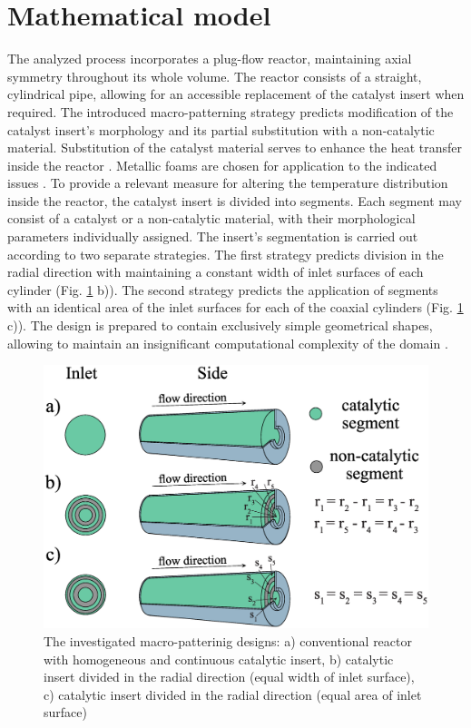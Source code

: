 \documentclass[preprint,12pt]{elsarticle}
\begin{document}
\section{Mathematical model}
\label{sec:math_model}

The analyzed process incorporates a plug-flow reactor, maintaining axial symmetry throughout its whole volume. The reactor consists of a straight, cylindrical pipe, allowing for an accessible replacement of the catalyst insert when required.  The introduced macro-patterning strategy predicts modification of the catalyst insert's morphology and its partial substitution with a non-catalytic material. Substitution of the catalyst material serves to enhance the heat transfer inside the reactor \cite{Pajak2018}. Metallic foams are chosen for application to the indicated issues \cite{Boomsma2003}. To provide a relevant measure for altering the temperature distribution inside the reactor, the catalyst insert is divided into segments. Each segment may consist of a catalyst or a non-catalytic material, with their morphological parameters individually assigned. The insert's segmentation is carried out according to two separate strategies. The first strategy predicts division in the radial direction with maintaining a constant width of inlet surfaces of each cylinder (Fig. \ref{fig:segments} b)). The second strategy predicts the application of segments with an identical area of the inlet surfaces for each of the coaxial cylinders (Fig. \ref{fig:segments} c)). The design is prepared to contain exclusively simple geometrical shapes, allowing to maintain an insignificant computational complexity of the domain \cite{Kaw2011}.  

\begin{figure}[h]
\centering
\includegraphics[width=120mm]{segments.eps}\hspace{2pc} 
\caption{\label{fig:segments} The investigated macro-patterinig designs: a) conventional reactor with homogeneous and continuous catalytic insert, b) catalytic insert divided in the radial direction (equal width of inlet surface),  c) catalytic insert divided in the radial direction  (equal area of inlet surface)}
\end{figure}
 
\end{document}
